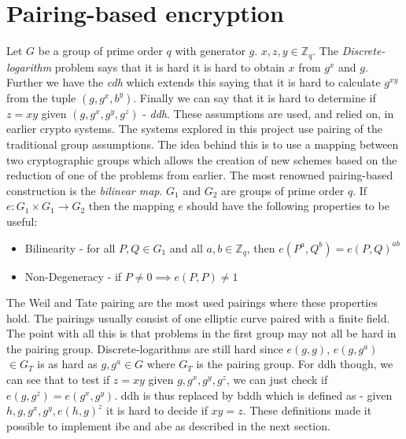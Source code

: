 \section{Pairing-based encryption}
Let $G$ be a group of prime order $q$ with generator $g$. $x,z,y \in \mathbb{Z}_q$. The \emph{Discrete-logarithm} problem says that it is hard it is hard to obtain $x$ from $g^x$ and $g$. Further we have the \emph{\gls{cdh}} which extends this saying that it is hard to calculate $g^{xy}$ from the tuple $(g, g^x, b^y)$. Finally we can say that it is hard to determine if $z=xy$ given $(g, g^x, g^y, g^z)$ - \emph{\gls{ddh}}. These assumptions are used, and relied on, in earlier crypto systems. The systems explored in this project use pairing of the traditional group assumptions. The idea behind this is to use a mapping between two cryptographic groups which allows the creation of new schemes based on the reduction of one of the problems from earlier. The most renowned pairing-based construction is the \emph{bilinear map}. $G_1$ and $G_2$ are groups of prime order $q$. If $e: G_1 \times G_1 \rightarrow G_2$ then the mapping $e$ should have the following properties to be useful: 
\begin{itemize}
\item Bilinearity - for all $P, Q \in G_1$ and all $a,b \in \mathbb{Z}_q$, then $e(P^a, Q^b) = e(P, Q)^{ab}$
\item Non-Degeneracy - if $P \neq 0 \implies e(P,P) \neq 1$
\end{itemize}
The Weil and Tate pairing are the most used pairings where these properties hold. The pairings usually consist of one elliptic curve paired with a finite field. 
The point with all this is that problems in the first group may not all be hard in the pairing group. Discrete-logarithms are still hard since $e(g,g)$, $e(g,g^a)$ $\in G_T$ is as hard as $g,g^a \in G$ where $G_T$ is the pairing group.
For \gls{ddh} though, we can see that to test if $z=xy$ given $g, g^x, g^y, g^z$, we can just check if $e(g, g^z) = e(g^x, g^y)$. \Gls{ddh} is thus replaced by \gls{bddh} which is defined as - given $h, g, g^x, g^y, e(h,g)^z$ it is hard to decide if $xy = z$. \cite{pairing-survey} These definitions made it possible to implement \gls{ibe} and \gls{abe} as described in the next section.


